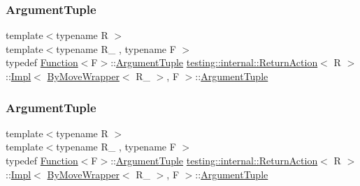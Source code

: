 \subsubsection{\texorpdfstring{ArgumentTuple}{ArgumentTuple}\hspace{0.1cm}{\footnotesize\ttfamily [2/3]}}
{\footnotesize\ttfamily template$<$typename R $>$ \\
template$<$typename R\+\_\+ , typename F $>$ \\
typedef \mbox{\hyperlink{structtesting_1_1internal_1_1_function}{Function}}$<$F$>$\+::\mbox{\hyperlink{classtesting_1_1_action_interface_af72720d864da4d606629e83edc003511}{Argument\+Tuple}} \mbox{\hyperlink{classtesting_1_1internal_1_1_return_action}{testing\+::internal\+::\+Return\+Action}}$<$ R $>$\+::\mbox{\hyperlink{classtesting_1_1internal_1_1_return_action_1_1_impl}{Impl}}$<$ \mbox{\hyperlink{structtesting_1_1internal_1_1_by_move_wrapper}{By\+Move\+Wrapper}}$<$ R\+\_\+ $>$, F $>$\+::\mbox{\hyperlink{classtesting_1_1_action_interface_af72720d864da4d606629e83edc003511}{Argument\+Tuple}}}

\mbox{\label{classtesting_1_1internal_1_1_return_action_1_1_impl_3_01_by_move_wrapper_3_01_r___01_4_00_01_f_01_4_a5b68d6715914e165ade5864060aa4213}} 
\subsubsection{\texorpdfstring{ArgumentTuple}{ArgumentTuple}\hspace{0.1cm}{\footnotesize\ttfamily [3/3]}}
{\footnotesize\ttfamily template$<$typename R $>$ \\
template$<$typename R\+\_\+ , typename F $>$ \\
typedef \mbox{\hyperlink{structtesting_1_1internal_1_1_function}{Function}}$<$F$>$\+::\mbox{\hyperlink{classtesting_1_1_action_interface_af72720d864da4d606629e83edc003511}{Argument\+Tuple}} \mbox{\hyperlink{classtesting_1_1internal_1_1_return_action}{testing\+::internal\+::\+Return\+Action}}$<$ R $>$\+::\mbox{\hyperlink{classtesting_1_1internal_1_1_return_action_1_1_impl}{Impl}}$<$ \mbox{\hyperlink{structtesting_1_1internal_1_1_by_move_wrapper}{By\+Move\+Wrapper}}$<$ R\+\_\+ $>$, F $>$\+::\mbox{\hyperlink{classtesting_1_1_action_interface_af72720d864da4d606629e83edc003511}{Argument\+Tuple}}}

